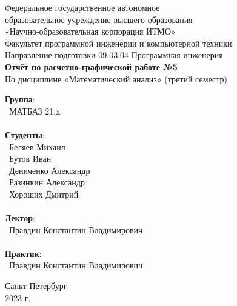 \documentclass{article}
\begin{document}
\begin{center}
    \Large
    Федеральное государственное автономное \\
    образовательное учреждение высшего образования \\ 
    «Научно-образовательная корпорация ИТМО»\\
    \vspace{0.5cm}
    \large
    Факультет программной инженерии и компьютерной техники \\
    Направление подготовки 09.03.04 Программная инженерия \\
    \vspace{1cm}
    \Large
    \textbf{Отчёт по расчетно-графической работе №5} \\
    По дисциплине «Математический анализ» (третий семестр)\\
    \large
    \vspace{8cm}

    \begin{minipage}{.33\textwidth}
    \end{minipage}
    \hfill
    \begin{minipage}{.4\textwidth}
        \textbf{Группа}: \vspace{.1cm} \\
        \ МАТБАЗ 21.x\\ \\
        \textbf{Студенты}: \vspace{.1cm} \\
        \ Беляев Михаил\\
        \ Бутов Иван\\
        \ Дениченко Александр\\
        \ Разинкин Александр\\
        \ Хороших Дмитрий\\
        \\
        \textbf{Лектор}: \vspace{.1cm} \\
        \ Правдин Константин Владимирович \\ \\
        \textbf{Практик}:  \\
        \ Правдин Константин Владимирович
    \end{minipage}
    \vfill
Санкт-Петербург\\ 2023 г.
\end{center}

\newpage
\end{document}
